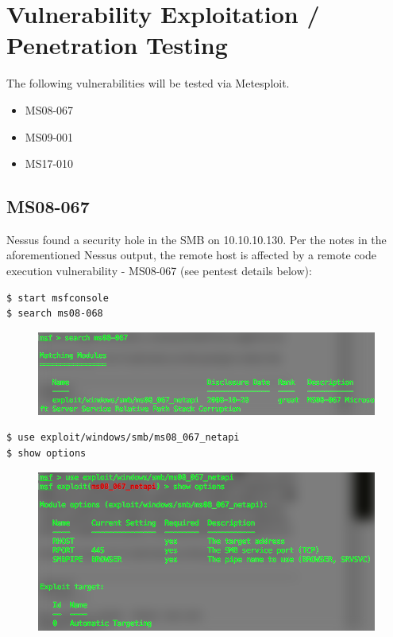 \section{Vulnerability Exploitation / Penetration Testing}
The following vulnerabilities will be tested via Metesploit.
\begin{itemize}
\item MS08-067
\item MS09-001
\item MS17-010
\end{itemize}

\subsection{MS08-067}
Nessus found a security hole in the SMB on 10.10.10.130. Per the notes in the aforementioned Nessus output, the remote host is affected by a remote code execution vulnerability - MS08-067 (see pentest details below):\\

\begin{lstlisting}[language=bash]
$ start msfconsole
$ search ms08-068
\end{lstlisting}

\begin{figure}[H]
\begin{center}
\includegraphics[width=\textwidth]{search.png}
\end{center}
\end{figure}

\begin{lstlisting}[language=bash]
$ use exploit/windows/smb/ms08_067_netapi
$ show options
\end{lstlisting}

\begin{figure}[H]
\begin{center}
\includegraphics[width=\textwidth]{show1.png}
\end{center}
\end{figure}

